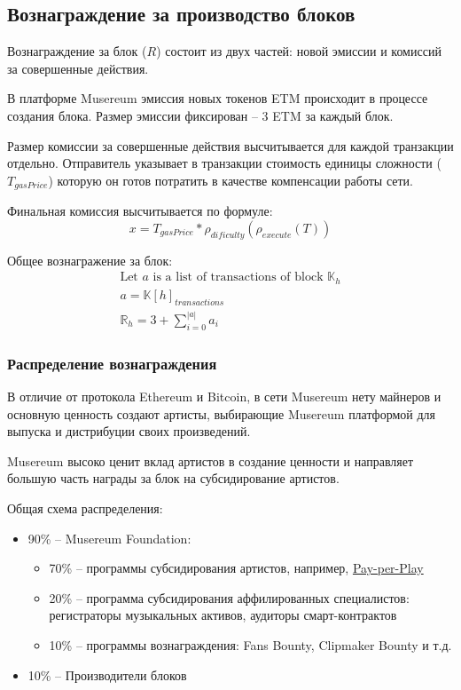 \documentclass[12pt]{report}
\begin{document}
\subsection{Вознаграждение за производство блоков}
\label{tech-blockchain-reward}
\begin{multicols}{2}
Вознаграждение за блок ($R$) состоит из двух частей: новой эмиссии и комиссий за совершенные действия.
 
В платформе Musereum эмиссия новых токенов ETM происходит в процессе создания блока. Размер эмиссии фиксирован – 3 ETM за каждый блок.

Размер комиссии за совершенные действия высчитывается для каждой транзакции отдельно. Отправитель указывает в транзакции стоимость единицы сложности ($T_{gasPrice}$) которую он готов потратить в качестве компенсации работы сети. 

Финальная комиссия высчитывается по формуле:
\begin{equation}
x = T_{gasPrice} * \rho_{dificulty}(\rho_{execute}(T))
\end{equation}

Общее вознагражение за блок:
\begin{equation}
\begin{aligned}
\text{Let } a \text{ is a list of transactions of block } \mathbb{K}_h \\
a = \mathbb{K}[h]_{transactions} \\
\mathbb{R}_h = 3 + \sum\limits_{i=0}^{|a|} a_i
\end{aligned}
\end{equation}
\end{multicols}

\subsubsection{Распределение вознаграждения}
\label{tech-blockchain-reward-distribution}
В отличие от протокола Ethereum и Bitcoin, в сети Musereum нету майнеров и основную ценность создают артисты, выбирающие Musereum платформой для выпуска и дистрибуции своих произведений.

Musereum высоко ценит вклад артистов в создание ценности и направляет большую часть награды за блок на субсидирование артистов.

Общая схема распределения:
\begin{itemize}
	\item 90\% – Musereum Foundation:
	\begin{itemize}
		\item 70\% – программы субсидирования артистов, например, \hyperref[tech-apps-soundchain-payperplay]{Pay-per-Play}
		\item 20\% – программа субсидирования аффилированных специалистов: регистраторы музыкальных активов, аудиторы смарт-контрактов
		\item 10\% – программы вознаграждения: Fans Bounty, Clipmaker Bounty и т.д.
	\end{itemize}
	\item 10\% – Производители блоков
\end{itemize}
\end{document}
